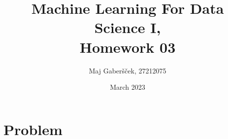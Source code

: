 \documentclass{article}
\title{Machine Learning For Data Science I, \\[0.1cm] Homework 03}
\author{Maj Gaberšček, 27212075}
\date{March 2023}
\begin{document}
\maketitle

\section{Problem}


\printbibliography
\end{document}
